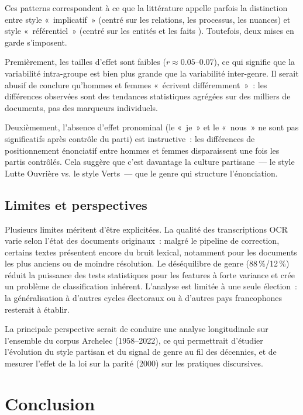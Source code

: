 \documentclass{article}
\begin{document}
Ces patterns correspondent à ce que la littérature appelle parfois la
distinction entre style «~implicatif~» (centré sur les relations, les processus,
les nuances) et style «~référentiel~» (centré sur les entités et les faits
\citep{argamon2003gender, lakoff1975language}). Toutefois, deux mises en garde
s'imposent.

Premièrement, les tailles d'effet sont faibles ($r \approx 0.05$--$0.07$),
ce qui signifie que la variabilité intra-groupe est bien plus grande que la
variabilité inter-genre. Il serait abusif de conclure qu'hommes et femmes
«~écrivent différemment~»~: les différences observées sont des tendances
statistiques agrégées sur des milliers de documents, pas des marqueurs individuels.

Deuxièmement, l'absence d'effet pronominal (le «~je~» et le «~nous~» ne sont
pas significatifs après contrôle du parti) est instructive~: les différences
de positionnement énonciatif entre hommes et femmes disparaissent une fois
les partis contrôlés. Cela suggère que c'est davantage la culture partisane~---
le style Lutte Ouvrière vs. le style Verts~--- que le genre qui structure
l'énonciation.

\subsection{Limites et perspectives}

Plusieurs limites méritent d'être explicitées.
La qualité des transcriptions OCR varie selon l'état des documents originaux~:
malgré le pipeline de correction, certains textes présentent encore du bruit
lexical, notamment pour les documents les plus anciens ou de moindre résolution.
Le déséquilibre de genre (88\,\%/12\,\%) réduit la puissance des tests
statistiques pour les features à forte variance et crée un problème de
classification inhérent.
L'analyse est limitée à une seule élection~: la généralisation à d'autres
cycles électoraux ou à d'autres pays francophones resterait à établir.

La principale perspective serait de conduire une analyse longitudinale sur
l'ensemble du corpus Archelec (1958--2022), ce qui permettrait d'étudier
l'évolution du style partisan et du signal de genre au fil des décennies,
et de mesurer l'effet de la loi sur la parité (2000) sur les pratiques discursives.

\section{Conclusion}
\label{sec:conclusion}
\end{document}
